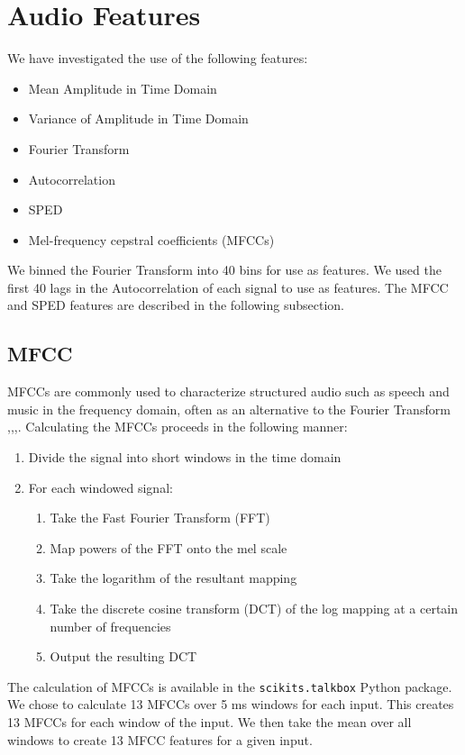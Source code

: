 \documentclass[journal]{IEEEtran}
\begin{document}
\section{Audio Features}
We have investigated the use of the following features:
\begin{itemize}
\item Mean Amplitude in Time Domain
\item Variance of Amplitude in Time Domain
\item Fourier Transform
\item Autocorrelation 
\item SPED
\item Mel-frequency cepstral coefficients (MFCCs)
\end{itemize}
We binned the Fourier Transform into 40 bins for use as features. We used the first 40 lags in the Autocorrelation of each signal to use as features. The MFCC and SPED features are described in the following subsection.

\subsection{MFCC}
MFCCs are commonly used to characterize structured audio such as speech and music in the frequency domain, often as an alternative to the Fourier Transform \cite{Chu},\cite{Chu2Env},\cite{guo2003content},\cite{aucouturier2007bag}. Calculating the MFCCs proceeds in the following manner\cite{rabiner1993fundamentals}:
\begin{enumerate}
\item Divide the signal into short windows in the time domain
\item For each windowed signal:
    \begin{enumerate}
    \item Take the Fast Fourier Transform (FFT)
    \item Map powers of the FFT onto the mel scale
    \item Take the logarithm of the resultant mapping
    \item Take the discrete cosine transform (DCT) of the log mapping at a certain number of frequencies
    \item Output the resulting DCT
    \end{enumerate}
\end{enumerate} 
The calculation of MFCCs is available in the \texttt{scikits.talkbox} Python package. We chose to calculate 13 MFCCs over 5 ms windows for each input. This creates 13 MFCCs for each window of the input. We then take the mean over all windows to create 13 MFCC features for a given input.
\end{document}
